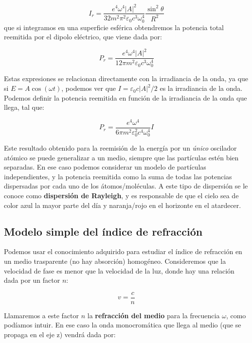 \documentclass[12pt]{article}
\numberwithin{equation}{section}
\numberwithin{figure}{section}
\begin{document}
\begin{equation}
I_r = \dfrac{e^4 \omega^4 |A|^2}{32 m^2 \pi^2 \varepsilon_0 c^3 \omega_0^4} \dfrac{\sin^2 \theta}{R^2}
\end{equation}
que si integramos en una superficie esférica obtendremos la potencia total reemitida por el dipolo eléctrico, que viene dada por:

\begin{equation}
P_r = \dfrac{e^4 \omega^4 |A|^2}{12 \pi m^2 \varepsilon_0	c^3 \omega_0^4}
\end{equation}

Estas expresiones se relacionan directamente con la irradiancia de la onda, ya que si $E=A \cos(\omega t)$, podemos ver que $I=\varepsilon_0 c |A|^2 / 2$ es la irradiancia de la onda. Podemos definir la potencia reemitida en función de la irradiancia de la onda que llega, tal que:

\begin{equation}
P_r = \dfrac{e^4 \omega^4}{6 \pi m^2 \varepsilon_0^2 c^4 \omega_0^4} I
\end{equation}

Este resultado obtenido para la reemisión de la energía por un \textit{único} oscilador atómico se puede generalizar a un medio, siempre que las partículas estén bien separadas. En ese caso podemos considerar un modelo de partículas independientes, y la potencia reemitida como la suma de todas las potencias dispersadas por cada uno de los átomos/moléculas. A este tipo de dispersión se le conoce como \textbf{dispersión de Rayleigh}, y es responsable de que el cielo sea de color azul la mayor parte del día y naranja/rojo en el horizonte en el atardecer. \\

\subsection{Modelo simple del índice de refracción}

Podemos usar el conocimiento adquirido para estudiar el índice de refracción en un medio trasparente (no hay absorción) homogéneo. Consideremos que la velocidad de fase es menor que la velocidad de la luz, donde hay una relación dada por un factor $n$:

\begin{equation}
v = \dfrac{c}{n}
\end{equation}

Llamaremos a este factor $n$ la \textbf{refracción del medio} para la frecuencia $ \omega$, como podíamos intuir. En ese caso la onda monocromática que llega al medio (que se propaga en el eje z) vendrá dada por:
\end{document}

